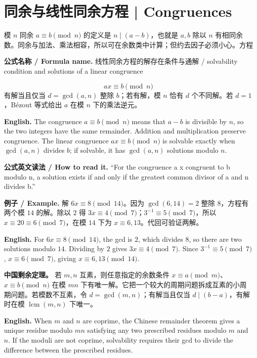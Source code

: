\documentclass[UTF8,11pt,a4paper]{ctexart}
\newcommand{\EN}[1]{\par\noindent \textbf{English.} #1\par}
\newcommand{\FORMULA}[2]{\par\noindent\textbf{公式名称 / Formula name.} #1 / #2\par}
\newcommand{\READ}[1]{\par\noindent \textbf{公式英文读法 / How to read it.} #1\par}
\newcommand{\EX}[2]{\par\noindent \textbf{例子 / Example.} #1\par\EN{#2}}
\begin{document}
\section{同余与线性同余方程 | Congruences}
\noindent 模 $n$ 同余 $a\equiv b\pmod n$ 的定义是 $n\mid(a-b)$，也就是 $a,b$ 除以 $n$ 有相同余数。同余与加法、乘法相容，所以可在余数类中计算；但约去因子必须小心。方程
\FORMULA{线性同余方程的解存在条件与通解}{solvability condition and solutions of a linear congruence}
\[
ax\equiv b\pmod n
\]
有解当且仅当 $d=\gcd(a,n)$ 整除 $b$；若有解，模 $n$ 恰有 $d$ 个不同解。若 $d=1$，Bézout 等式给出 $a$ 在模 $n$ 下的乘法逆元。
\EN{The congruence $a\equiv b\pmod n$ means that $a-b$ is divisible by $n$, so the two integers have the same remainder. Addition and multiplication preserve congruence. The linear congruence $ax\equiv b\pmod n$ is solvable exactly when $\gcd(a,n)$ divides $b$; if solvable, it has $\gcd(a,n)$ solutions modulo $n$.}
\READ{“For the congruence a x congruent to b modulo n, a solution exists if and only if the greatest common divisor of a and n divides b.”}

\EX{解 $6x\equiv8\pmod{14}$。因为 $\gcd(6,14)=2$ 整除 $8$，方程有两个模 $14$ 的解。除以 $2$ 得 $3x\equiv4\pmod7$；$3^{-1}\equiv5\pmod7$，所以 $x\equiv20\equiv6\pmod7$，在模 $14$ 下为 $x\equiv6,13$。代回可验证两解。}{For $6x\equiv8\pmod{14}$, the gcd is $2$, which divides $8$, so there are two solutions modulo $14$. Dividing by $2$ gives $3x\equiv4\pmod7$. Since $3^{-1}\equiv5\pmod7$, $x\equiv6\pmod7$, giving $x\equiv6,13\pmod{14}$.}

\noindent \textbf{中国剩余定理。} 若 $m,n$ 互素，则任意指定的余数条件 $x\equiv a\pmod m$、$x\equiv b\pmod n$ 在模 $mn$ 下有唯一解。它把一个较大的周期问题拆成互素的小周期问题。若模数不互素，令 $d=\gcd(m,n)$；有解当且仅当 $d\mid(b-a)$，有解时在模 $\operatorname{lcm}(m,n)$ 下唯一。
\EN{When $m$ and $n$ are coprime, the Chinese remainder theorem gives a unique residue modulo $mn$ satisfying any two prescribed residues modulo $m$ and $n$. If the moduli are not coprime, solvability requires their gcd to divide the difference between the prescribed residues.}
\end{document}
